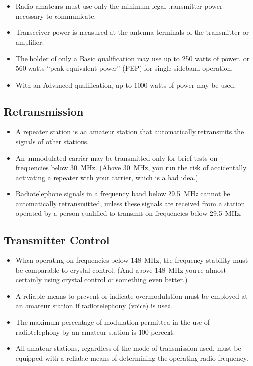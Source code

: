 \documentclass[letterpaper,12pt]{scrartcl}
\begin{document}
\begin{itemize}
\item Radio amateurs must use only the minimum legal transmitter power necessary to communicate.
\item Transceiver power is measured at the antenna terminals of the transmitter or amplifier. 
\item The holder of only a Basic qualification may use up to 250 watts of power, or 560 watts ``peak equivalent power'' (PEP) for single sideband operation.
\item With an Advanced qualification, up to 1000 watts of power may be used.
\end{itemize}

\subsection{Retransmission}

\begin{itemize}
\item A repeater station is an amateur station that automatically retransmits the signals of other stations.
\item An unmodulated carrier may be transmitted only for brief tests on frequencies below 30~MHz.
(Above 30~MHz, you run the risk of accidentally activating a repeater with your carrier, which is a bad idea.)
\item Radiotelephone signals in a frequency band below 29.5~MHz cannot be automatically retransmitted, unless these signals are received
from a station operated by a person qualified to transmit on frequencies below 29.5~MHz.
\end{itemize}

\subsection{Transmitter Control}

\begin{itemize}
\item When operating on frequencies below 148~MHz, the frequency stability must be comparable to crystal control.
(And above 148~MHz you're almost certainly using crystal control or something even better.)
\item A reliable means to prevent or indicate overmodulation must be employed at an amateur station if radiotelephony (voice) is used.
\item The maximum percentage of modulation permitted in the use of radiotelephony by an amateur station is 100 percent.
\item All amateur stations, regardless of the mode of transmission used, must be equipped with a reliable means of determining the operating radio frequency.
\end{itemize}
\end{document}
